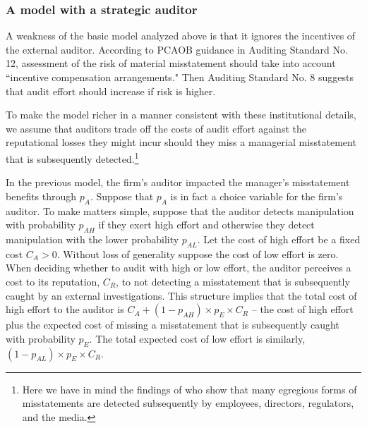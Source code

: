 
\subsubsection{A model with a strategic auditor}
A weakness of the basic model analyzed above is that it ignores the incentives of the external auditor. According to PCAOB guidance in Auditing Standard No. 12, assessment of the risk of material misstatement should take into account ``incentive compensation arrangements."
Then Auditing Standard No. 8 suggests that audit effort should increase if risk is higher.

To make the model richer in a manner consistent with these institutional details, we assume that auditors trade off the costs of audit effort against the reputational losses they might incur should they miss a managerial misstatement that is subsequently detected.\footnote{
Here we have in mind the findings of \citet{Dyck:2010kh} who show that many egregious forms of misstatements are detected subsequently by employees, directors, regulators, and the media.} 

In the previous model, the firm's auditor impacted the manager's misstatement benefits through $p_A$. 
Suppose that $p_A$ is in fact a choice variable for the firm's auditor. 
To make matters simple, suppose that the auditor detects manipulation with probability $p_{AH}$ if they exert high effort and  otherwise they detect manipulation with the lower probability $p_{AL}$. 
Let the cost of high effort be a fixed cost $C_A > 0$. 
Without loss of generality suppose the cost of low effort is zero. 
When deciding whether to audit with high or low effort, the auditor perceives a cost to its reputation, $C_R$, to not detecting a misstatement that is subsequently caught by an external investigations. 
This structure implies that the total cost of high effort to the auditor is $C_A + (1-p_{AH}) \times p_E \times C_R$ -- the cost of high effort plus the expected cost of missing a misstatement that is subsequently caught with probability $p_E$. 
The total expected cost of
low effort is similarly, $(1-p_{AL}) \times p_E \times C_R$. 

